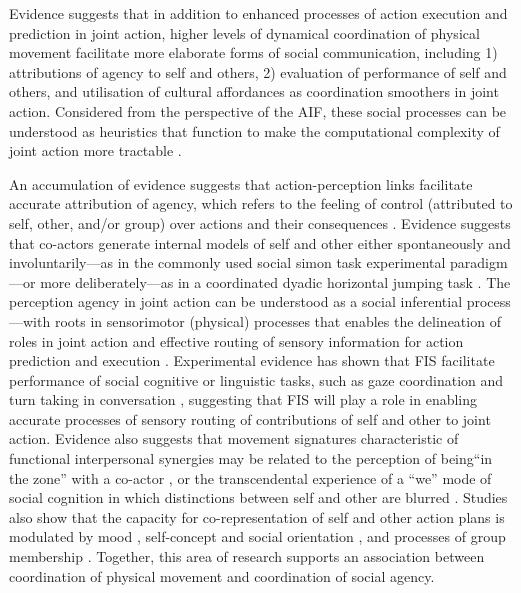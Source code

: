 \begin{CJK}{UTF8}{gbsn}
Evidence suggests that in addition to enhanced processes of action execution and prediction in joint action, higher levels of dynamical coordination of physical movement facilitate more elaborate forms of social communication, including 1) attributions of agency to self and others,  2) evaluation of performance of self and others, and utilisation of cultural affordances as coordination smoothers in joint action. Considered from the perspective of the AIF, these social processes can be understood as heuristics that function to make the computational complexity of joint action more tractable \citep{Moutoussis2014}.

An accumulation of evidence suggests that action-perception links facilitate accurate attribution of agency, which refers to the feeling of control (attributed to self, other, and/or group) over actions and their consequences \citep{Moore2016}.
Evidence suggests that co-actors generate internal models of self and other either spontaneously and involuntarily---as in the commonly used social simon task experimental paradigm \citep{Sebanz2003,Atmaca2008}---or more deliberately---as in a coordinated dyadic horizontal jumping task \citep{Vesper2012}.  The perception agency in joint action can be understood as a social inferential process---with roots in sensorimotor (physical) processes that enables the delineation of roles in joint action and effective routing of sensory information for action prediction and execution \citep{Sato2008,Friston2015,Kelso2016}.  Experimental evidence has shown that FIS facilitate performance of social cognitive or linguistic tasks, such as gaze coordination and turn taking in conversation \citep{Miles2010,Richardson2005,Shockley2009}, suggesting that FIS will play a role in enabling accurate processes of sensory routing of contributions of self and other to joint action.
Evidence also suggests that movement signatures characteristic of functional interpersonal synergies may be related to the perception of  being``in the zone'' with a co-actor \citep{Noy2011,Noy2015,Hart2014}, or the transcendental experience of a ``we'' mode of social cognition in which distinctions between self and other are blurred \citep{Gallotti2013}.  Studies also show that the capacity for co-representation of self and other action plans is modulated by mood \citep[positive or negative affect, see][]{Kuhbandner2010}, self-concept and social orientation \citep{Colzato2012,Colzato2012a}, and processes of group membership \citep{DeBruijn2008,Aquino2015}.  Together, this area of research supports an association between coordination of physical movement and coordination of social agency.


\end{CJK}
